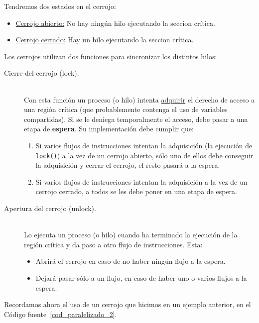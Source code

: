 Tendremos dos estados en el cerrojo:
\begin{itemize}
    \item \underline{Cerrojo abierto:} No hay ningún hilo ejecutando la seccion crítica.
    \item \underline{Cerrojo cerrado:} Hay un hilo ejecutando la seccion crítica.
\end{itemize}
Los cerrojos utilizan dos funciones para sincronizar los distintos hilos:
\begin{description}
    \item [Cierre del cerrojo (lock).]~\\
        Con esta función un proceso (o hilo) intenta \underline{adquirir} el derecho de acceso a una región crítica (que probablemente contenga el uso de variables compartidas). Si se le deniega temporalmente el acceso, debe pasar a una etapa de \textbf{espera}. Su implementación debe cumplir que:
        \begin{enumerate}
            \item Si varios flujos de instrucciones intentan la adquisición (la ejecución de \verb|lock()|) a la vez de un cerrojo abierto, sólo uno de ellos debe conseguir la adquisición y cerrar el cerrojo, el resto pasará a la espera.
            \item Si varios flujos de instrucciones intentan la adquisición a la vez de un cerrojo cerrado, a todos se les debe poner en una etapa de espera.
        \end{enumerate}
    \item [Apertura del cerrojo (unlock).]~\\
        Lo ejecuta un proceso (o hilo) cuando ha terminado la ejecución de la región crítica y da paso a otro flujo de instrucciones. Esta:
        \begin{itemize}
            \item Abrirá el cerrojo en caso de no haber ningún flujo a la espera.
            \item Dejará pasar sólo a un flujo, en caso de haber uno o varios flujos a la espera.
        \end{itemize}
\end{description}
Recordamos ahora el uso de un cerrojo que hicimos en un ejemplo anterior, en el Código fuente~\ref{cod_paralelizado_2}.\\

